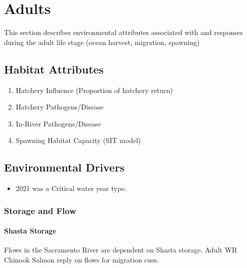 \documentclass[
]{book}
\providecommand{\tightlist}{%
  \setlength{\itemsep}{0pt}\setlength{\parskip}{0pt}}
\theoremstyle{definition}
\theoremstyle{definition}
\theoremstyle{definition}
\theoremstyle{definition}
\theoremstyle{remark}
\begin{document}
\hypertarget{adults}{%
\chapter{Adults}\label{adults}}

This section describes environmental attributes associated with and responses during the adult life stage (ocean harvest, migration, spawning)

\hypertarget{habitat-attributes}{%
\section{Habitat Attributes}\label{habitat-attributes}}

\begin{enumerate}
\def\labelenumi{\arabic{enumi}.}
\item
  Hatchery Influence (Proportion of hatchery return)
\item
  Hatchery Pathogens/Disease
\item
  In-River Pathogens/Disease
\item
  Spawning Habitat Capacity (SIT model)
\end{enumerate}

\hypertarget{wq}{%
\section{Environmental Drivers}\label{wq}}

\begin{itemize}
\tightlist
\item
  2021 was a Critical water year type.
\end{itemize}

\hypertarget{storage-and-flow}{%
\subsection{Storage and Flow}\label{storage-and-flow}}

\hypertarget{shasta-storage}{%
\subsubsection{Shasta Storage}\label{shasta-storage}}

Flows in the Sacramento River are dependent on Shasta storage. Adult WR Chinook Salmon reply on flows for migration cues.
\end{document}
